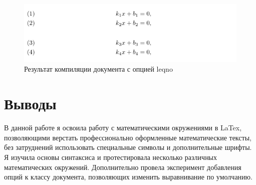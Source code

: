 \documentclass{article}
\begin{document}
\begin{figure}[H]
  \centering
  \includegraphics[width=\textwidth]{images/left_numbers.png}
  \caption{Результат компиляции документа с опцией leqno}
  \label{fig:left_numbers}
\end{figure}

\section{Выводы}

В данной работе я освоила работу с математическими окружениями в LaTex, позволяющими верстать профессионально оформленные математические тексты, без затруднений использовать специальные символы и дополнительные шрифты. Я изучила основы синтаксиса и протестировала несколько различных математических окружений. Дополнительно провела эксперимент добавления опций к классу документа, позволяющих изменить выравнивание по умолчанию. 



\end{document}
